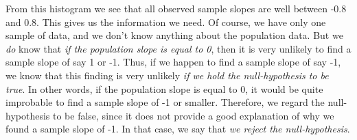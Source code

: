 \documentclass[]{report}\usepackage[]{graphicx}\usepackage[]{color}
\begin{document}
From this histogram we see that all observed sample slopes are well between -0.8 and 0.8. This gives us the information we need. Of course, we have only one sample of data, and we don't know anything about the population data. But we \textit{do} know that \textit{if the population slope is equal to 0}, then it is very unlikely to find a sample slope of say 1 or -1. Thus, if we happen to find a sample slope of say -1, we know that this finding is very unlikely \textit{if we hold the null-hypothesis to be true}. In other words, if the population slope is equal to 0, it would be quite improbable to find a sample slope of -1 or smaller. Therefore, we regard the null-hypothesis to be false, since it does not provide a good explanation of why we found a sample slope of -1. In that case, we say that \textit{we reject the null-hypothesis}.
\end{document}
